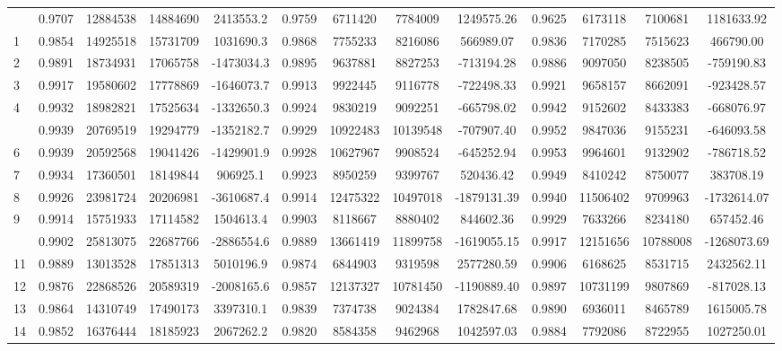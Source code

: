 \documentclass[
  12pt,
]{article}
\begin{document}
\begin{longtable}[t]{lcccccccccccc}
\endfoot
\bottomrule
\endlastfoot
0 & 0.9707 & 12884538 & 14884690 & 2413553.2 & 0.9759 & 6711420 & 7784009 & 1249575.26 & 0.9625 & 6173118 & 7100681 & 1181633.92\\
1 & 0.9854 & 14925518 & 15731709 & 1031690.3 & 0.9868 & 7755233 & 8216086 & 566989.07 & 0.9836 & 7170285 & 7515623 & 466790.00\\
2 & 0.9891 & 18734931 & 17065758 & -1473034.3 & 0.9895 & 9637881 & 8827253 & -713194.28 & 0.9886 & 9097050 & 8238505 & -759190.83\\
3 & 0.9917 & 19580602 & 17778869 & -1646073.7 & 0.9913 & 9922445 & 9116778 & -722498.33 & 0.9921 & 9658157 & 8662091 & -923428.57\\
4 & 0.9932 & 18982821 & 17525634 & -1332650.3 & 0.9924 & 9830219 & 9092251 & -665798.02 & 0.9942 & 9152602 & 8433383 & -668076.97\\
\addlinespace
5 & 0.9939 & 20769519 & 19294779 & -1352182.7 & 0.9929 & 10922483 & 10139548 & -707907.40 & 0.9952 & 9847036 & 9155231 & -646093.58\\
6 & 0.9939 & 20592568 & 19041426 & -1429901.9 & 0.9928 & 10627967 & 9908524 & -645252.94 & 0.9953 & 9964601 & 9132902 & -786718.52\\
7 & 0.9934 & 17360501 & 18149844 & 906925.1 & 0.9923 & 8950259 & 9399767 & 520436.42 & 0.9949 & 8410242 & 8750077 & 383708.19\\
8 & 0.9926 & 23981724 & 20206981 & -3610687.4 & 0.9914 & 12475322 & 10497018 & -1879131.39 & 0.9940 & 11506402 & 9709963 & -1732614.07\\
9 & 0.9914 & 15751933 & 17114582 & 1504613.4 & 0.9903 & 8118667 & 8880402 & 844602.36 & 0.9929 & 7633266 & 8234180 & 657452.46\\
\addlinespace
10 & 0.9902 & 25813075 & 22687766 & -2886554.6 & 0.9889 & 13661419 & 11899758 & -1619055.15 & 0.9917 & 12151656 & 10788008 & -1268073.69\\
11 & 0.9889 & 13013528 & 17851313 & 5010196.9 & 0.9874 & 6844903 & 9319598 & 2577280.59 & 0.9906 & 6168625 & 8531715 & 2432562.11\\
12 & 0.9876 & 22868526 & 20589319 & -2008165.6 & 0.9857 & 12137327 & 10781450 & -1190889.40 & 0.9897 & 10731199 & 9807869 & -817028.13\\
13 & 0.9864 & 14310749 & 17490173 & 3397310.1 & 0.9839 & 7374738 & 9024384 & 1782847.68 & 0.9890 & 6936011 & 8465789 & 1615005.78\\
14 & 0.9852 & 16376444 & 18185923 & 2067262.2 & 0.9820 & 8584358 & 9462968 & 1042597.03 & 0.9884 & 7792086 & 8722955 & 1027250.01\\

\end{longtable}
\end{document}
